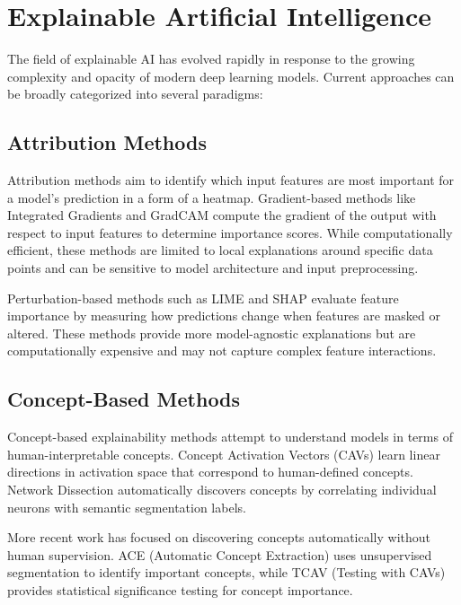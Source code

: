 \documentclass[licencjacka,en]{pracamgr}
\begin{document}
\section{Explainable Artificial Intelligence}

The field of explainable AI has evolved rapidly in response to the growing complexity and opacity of modern deep learning models. Current approaches can be broadly categorized into several paradigms:

\subsection{Attribution Methods}

Attribution methods aim to identify which input features are most important for a model's prediction in a form of a heatmap. Gradient-based methods like Integrated Gradients \citep{sundararajan2017axiomaticattributiondeepnetworks} and GradCAM \citep{8237336} compute the gradient of the output with respect to input features to determine importance scores. While computationally efficient, these methods are limited to local explanations around specific data points and can be sensitive to model architecture and input preprocessing.

Perturbation-based methods such as LIME \citep{ribeiro2016whyitrustyou} and SHAP \citep{lundberg2017unifiedapproachinterpretingmodel} evaluate feature importance by measuring how predictions change when features are masked or altered. These methods provide more model-agnostic explanations but are computationally expensive and may not capture complex feature interactions.

\subsection{Concept-Based Methods}

Concept-based explainability methods attempt to understand models in terms of human-interpretable concepts. Concept Activation Vectors (CAVs) \citep{kim2018interpretabilityfeatureattributionquantitative} learn linear directions in activation space that correspond to human-defined concepts. Network Dissection \citep{bau2017networkdissectionquantifyinginterpretability} automatically discovers concepts by correlating individual neurons with semantic segmentation labels.

More recent work has focused on discovering concepts automatically without human supervision. ACE (Automatic Concept Extraction) \citep{ghorbani2019automaticconceptbasedexplanations} uses unsupervised segmentation to identify important concepts, while TCAV (Testing with CAVs) \citep{kim2018interpretabilityfeatureattributionquantitative} provides statistical significance testing for concept importance.
\end{document}
